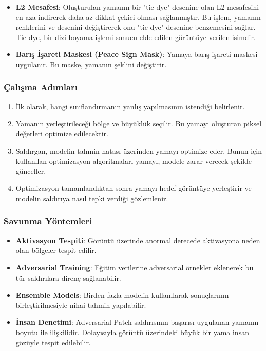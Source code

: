 \begin{itemize}
    \item \textbf{L2 Mesafesi}: Oluşturulan yamanın bir "tie-dye" desenine olan L2 mesafesini en aza indirerek daha az dikkat çekici olması sağlanmıştır. Bu işlem, yamanın renklerini ve desenini değiştirerek onu "tie-dye" desenine benzemesini sağlar. Tie-dye, bir dizi boyama işlemi sonucu elde edilen görüntüye verilen isimdir.
    \item \textbf{Barış İşareti Maskesi (Peace Sign Mask)}: Yamaya barış işareti maskesi uygulanır. Bu maske, yamanın şeklini değiştirir.
\end{itemize}

\subsubsection{Çalışma Adımları}

\begin{enumerate}
    \item İlk olarak, hangi sınıflandırmanın yanlış yapılmasının istendiği belirlenir.
    \item Yamanın yerleştirileceği bölge ve büyüklük seçilir. Bu yamayı oluşturan piksel değerleri optimize edilecektir.
    \item Saldırgan, modelin tahmin hatası üzerinden yamayı optimize eder. Bunun için kullanılan optimizasyon algoritmaları yamayı, modele zarar verecek şekilde günceller.
    \item Optimizasyon tamamlandıktan sonra yamayı hedef görüntüye yerleştirir ve modelin saldırıya nasıl tepki verdiği gözlemlenir.
\end{enumerate}

\subsubsection{Savunma Yöntemleri}

\begin{itemize}
    \item \textbf{Aktivasyon Tespiti}: Görüntü üzerinde anormal derecede aktivasyona neden olan bölgeler tespit edilir.
    \item \textbf{Adversarial Training}: Eğitim verilerine adversarial örnekler eklenerek bu tür saldırılara direnç sağlanabilir.
    \item \textbf{Ensemble Models}: Birden fazla modelin kullanılarak sonuçlarının birleştirilmesiyle nihai tahmin yapılabilir.
    \item \textbf{İnsan Denetimi}: Adversarial Patch saldırısının başarısı uygulanan yamanın boyutu ile ilişkilidir. Dolayısıyla görüntü üzerindeki büyük bir yama insan gözüyle tespit edilebilir.
\end{itemize}

